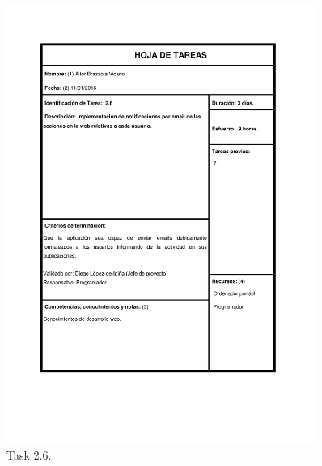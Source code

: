 \documentclass{DeustoFDP}
\begin{document}
\begin{figure}[H]
	\centering
	\includegraphics[width=0.9\textwidth]{fig/Tareas/26}
	\caption{Task 2.6.}
	\label{fig:t26}
\end{figure}
\end{document}
